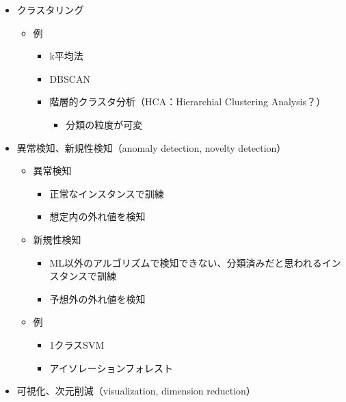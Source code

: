 \begin{itemize}
\begin{itemize}
    \begin{itemize}
    \tightlist
    \item
      クラスタリング

      \begin{itemize}
      \tightlist
      \item
        例

        \begin{itemize}
        \tightlist
        \item
          k平均法
        \item
          DBSCAN
        \item
          階層的クラスタ分析（HCA：Hierarchial Clustering Analysis？）

          \begin{itemize}
          \tightlist
          \item
            分類の粒度が可変
          \end{itemize}
        \end{itemize}
      \end{itemize}
    \item
      異常検知、新規性検知（anomaly detection, novelty detection）

      \begin{itemize}
      \tightlist
      \item
        異常検知

        \begin{itemize}
        \tightlist
        \item
          正常なインスタンスで訓練
        \item
          想定内の外れ値を検知
        \end{itemize}
      \item
        新規性検知

        \begin{itemize}
        \tightlist
        \item
          ML以外のアルゴリズムで検知できない、分類済みだと思われるインスタンスで訓練
        \item
          予想外の外れ値を検知
        \end{itemize}
      \item
        例

        \begin{itemize}
        \tightlist
        \item
          1クラスSVM
        \item
          アイソレーションフォレスト
        \end{itemize}
      \end{itemize}
    \item
      可視化、次元削減（visualization, dimension reduction）


\end{itemize}
\end{itemize}
\end{itemize}
